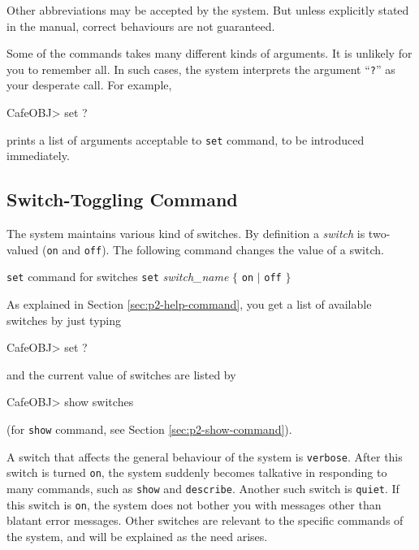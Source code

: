 \documentclass[a4paper]{memoir}
\begin{document}
\begin{warning}
  Other abbreviations may be accepted by the system. But unless
  explicitly stated in the manual, correct behaviours are not
  guaranteed.
\end{warning}

Some of the commands takes many different kinds of arguments. It is
unlikely for you to remember all. In such cases, the system
interprets the argument ``\verb|?|'' as your desperate call. For
example,
\begin{vvtm}
\begin{ccode}
  CafeOBJ> set ?
\end{ccode}
\end{vvtm}
prints a list of arguments acceptable to \verb|set| command, to be introduced
immediately.

\subsection{Switch-Toggling Command}\label{sec:p2-set-command}

The system maintains various kind of switches. By definition a
{\em switch} is two-valued (\verb|on|
and \verb|off|). The following command changes
the value of a switch.

\begin{bsyntax} \texttt{set} command for switches \Hline
\texttt{set} \textit{switch\_name} $\{$ \texttt{on} $|$ \texttt{off} $\}$
\end{bsyntax}

As explained in Section \ref{sec:p2-help-command},
you get a list of available switches by just typing
\begin{vvtm}
\begin{ccode}
  CafeOBJ> set ?
\end{ccode}
\end{vvtm}
and the current value of switches are listed by
\begin{vvtm}
\begin{ccode}
  CafeOBJ> show switches
\end{ccode}
\end{vvtm}
(for \verb|show| command,
see Section \ref{sec:p2-show-command}).

A switch that affects the general behaviour of the system is
\verb|verbose|. After this switch is turned \verb|on|, the system suddenly
becomes talkative in responding to many commands, such as \verb|show| and
\verb|describe|.
Another such switch is \verb|quiet|. If this switch is \verb|on|,
the system does not bother you with messages other than blatant error messages.
Other switches are relevant to the specific commands of the system,
and will be explained as the need arises.
\end{document}
